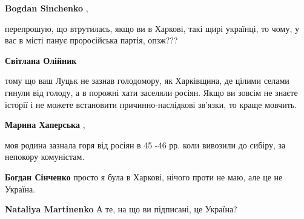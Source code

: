 \begin{itemize}
\begin{itemize}
\begin{itemize}
\textbf{Bogdan Sinchenko} ,

перепрошую, що втрутилась, якщо ви в Харкові, такі щирі українці, то чому, у вас в місті панує проросійська партія, опзж???


 
\textbf{Світлана Олійник} 

тому що ваш Луцьк не зазнав голодомору, як Харківщина, де цілими селами гинули
від голоду, а в порожні хати заселяли росіян. Якщо ви зовсім не знаєте історії
і не можете встановити причинно-наслідкові зв'язки, то краще мовчить.


 
\textbf{Марина Хаперська} ,

моя родина зазнала горя від росіян в 45 -46 рр. коли вивозили до сибіру, за непокору комуністам.

\end{itemize}

 
\textbf{Богдан Сінченко} просто я була в Харкові, нічого проти не маю, але це не Україна.

\begin{itemize}
 
\textbf{Nataliya Martinenko} А те, на що ви підписані, це Україна?

 

\end{itemize}
\end{itemize}
\end{itemize}
